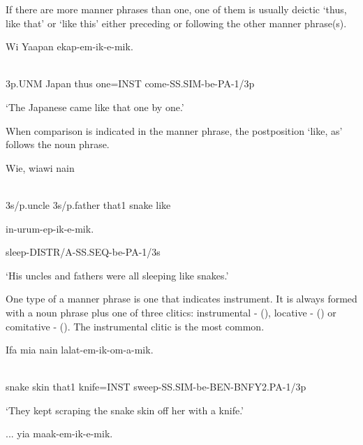 If there are more manner phrases than one, one of them is usually deictic  `thus, like that' or  `like this' either preceding or following the other manner phrase(s).

\ea%
\label{ex:x883}
\gll Wi  Yaapan    ekap-em-ik-e-mik. \\
      \\
\glt
\z

3p.UNM  Japan  thus  one=INST  come-SS.SIM-be-PA-1/3p

`The Japanese came like that one by one.'

When comparison is indicated in the manner phrase, the postposition  `like, as' follows the noun phrase.

\ea%
\label{ex:x885}
\gll Wie,  wiawi  nain   \\
      \\
\glt
\z

3s/p.uncle  3s/p.father  that1  snake  like  

in-urum-ep-ik-e-mik.

sleep-DISTR/A-SS.SEQ-be-PA-1/3s

`His uncles and fathers were all sleeping like snakes.'

One type of a manner phrase is one that indicates instrument.  It is always formed with a noun phrase plus one of three clitics: instrumental -\textstyleStyleVernacularWordsItalic{} (), locative -  ()\textstyleStyleVernacularWordsItalic{} or comitative -\textstyleStyleVernacularWordsItalic{} (). The instrumental clitic is the most common. 

\ea%
\label{ex:x886}
\gll Ifa  mia  nain    lalat-em-ik-om-a-mik. \\
      \\
\glt
\z

snake  skin  that1  knife=INST  sweep-SS.SIM-be-BEN-BNFY2.PA-1/3p

`They kept scraping the snake skin off her with a knife.'

\ea%
\label{ex:x889}
\gll ...  yia  maak-em-ik-e-mik. \\
      \\
\glt
\z

